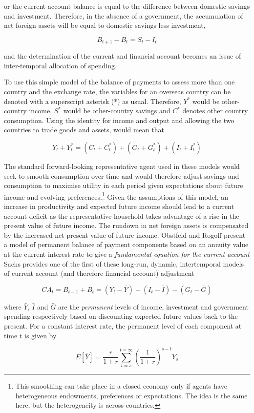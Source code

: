 \documentclass[12pt, a4paper, oneside]{article} %
\begin{document}
or the current account balance is equal to the difference between domestic savings and investment. 
Therefore, in the absence of a government, the accumulation of net foreign assets will be equal to domestic savings less investment,  

\begin{equation}
 B_{t+1}-B_{t}=S_t-I_t
\end{equation} 

and the determination of the current and financial account becomes an issue of inter-temporal allocation of spending.  

To use this simple model of the balance of payments to assess more than one country and the exchange rate, the variables for an overseas country can be denoted with a superscript asterisk (*) as usual.   Therefore, $Y^*$ would be other-country income, $S^*$ would be other-country savings and $C^*$ denotes other country consumption.  Using the identity for income and output and allowing the two countries to trade goods and assets, would mean that 

 \begin{equation} 
Y_t+Y^*_t=(C_t+C^*_t) + (G_t +G^*_t)+(I_t +I^*_t) 
\end{equation}

The standard forward-looking representative agent used in these models would seek to smooth consumption over time and would therefore adjust savings and consumption to maximise utility in each period given expectations about future income and evolving preferences.\footnote{This smoothing can take place in a closed economy only if agents have heterogeneous endowments, preferences or expectations.  The idea is the same here, but the heterogeneity is across countries.}  Given the assumptions of this model, an increase in productivity and expected future income should lead to a current account deficit as the representative household takes advantage of a rise in the present value of future income.  The rundown in net foreign assets is compensated by the increased net present value of future income.  Obstfeld and Rogoff present a model of permanent balance of payment components based on an annuity value at the current interest rate to give a \emph{fundamental equation for the current account} %
Sachs provides one of the first of these long-run, dynamic, intertemporal models of current account (and therefore financial account) adjustment %

\begin{equation} 
CA_t=B_{t+1}+B_t=(Y_t-\bar{Y})+(I_t-\bar{I})-(G_t-\bar{G}) 
\end{equation} 

where $\bar{Y}$, $\bar{I}$ and $\bar{G}$ are the \emph{permanent} levels of income, investment and government spending respectively based on discounting expected future values back to the present. For a constant interest rate, the permanent level of each component at time t is given by   

 \begin{equation} 
E[\bar{Y}]=\frac{r}{1+r}\sum_{t=s}^{t=\infty}\left (\frac{1}{1+r}\right)^{s-t}Y_s 
\end{equation}
\end{document}
